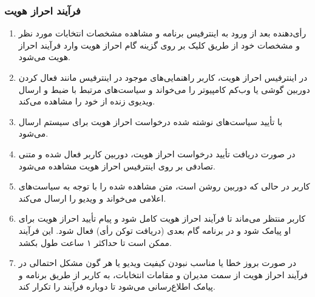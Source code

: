 \documentclass[12pt]{article}
\begin{document}
\subsubsection{فرآیند احراز هویت}
\begin{enumerate}[label=(\arabic*)]
\item
رأی‌دهنده بعد از ورود به اینترفیس برنامه و مشاهده مشخصات انتخابات مورد نظر و مشخصات خود از طریق کلیک بر روی گزینه گام احراز هویت وارد فرآیند احراز هویت می‌شود. 
\item
در اینترفیس احراز هویت، کاربر  راهنمایی‌های موجود در اینترفیس مانند فعال کردن دوربین گوشی یا وب‌کم کامپیوتر را می‌خواند و سیاست‌های مرتبط با ضبط و ارسال ویدیوی زنده از خود را مشاهده می‌کند. 
\item
با تأیید سیاست‌های نوشته شده درخواست احراز هویت برای سیستم ارسال می‌شود.
\item
در صورت دریافت تأیید درخواست احراز هویت، دوربین کاربر فعال شده و  متنی تصادفی بر روی اینترفیس احراز هویت مشاهده می‌شود. 
\item
کاربر در حالی که دوربین روشن است، متن مشاهده شده را با توجه به سیاست‌های اعلامی می‌خواند و ویدیو را ارسال می‌کند. 
\item
کاربر منتظر می‌ماند تا فرآیند احراز هویت کامل شود و پیام تأیید احراز هویت برای او پیامک شود و در برنامه گام بعدی (دریافت توکن رأی) فعال شود. 
این فرآیند ممکن است تا  حداکثر ۱ ساعت طول بکشد.
\item
در صورت بروز خطا یا مناسب نبودن کیفیت ویدیو یا هر گون مشکل احتمالی در فرآیند احراز هویت از سمت مدیران و مقامات انتخابات، به کاربر  از طریق برنامه و پیامک اطلاع‌رسانی می‌شود تا دوباره فرآیند را تکرار کند. 
\end{enumerate}
\end{document}
